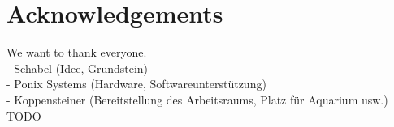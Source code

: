 \section*{Acknowledgements}
\cfoot{}

We want to thank everyone. \\
 - Schabel (Idee, Grundstein) \\
 - Ponix Systems (Hardware, Softwareunterst\"utzung) \\
 - Koppensteiner (Bereitstellung des Arbeitsraums, Platz für Aquarium usw.) \\
TODO

